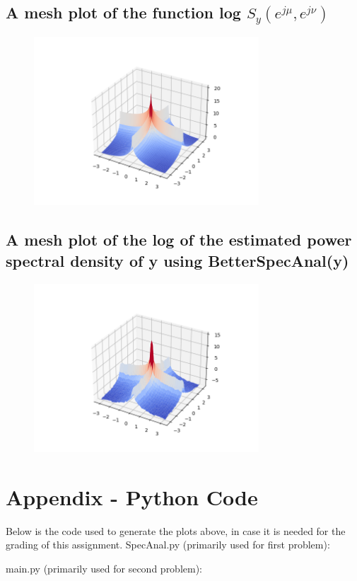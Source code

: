 \documentclass{article}
\begin{document}
\subsection{A mesh plot of the function log $S_y(e^{j\mu}, e^{j\nu})$}
\begin{figure}[H]
    \centering
    \includegraphics[width=0.75\textwidth]{../images/y-log-pwr-spec-density-theoretical.png}
    \begin{center}
    \end{center}
\end{figure}
\subsection{A mesh plot of the log of the estimated power spectral density of y using BetterSpecAnal(y)}
\begin{figure}[H]
    \centering
    \includegraphics[width=0.75\textwidth]{../images/y-log-pwr-spec-density-better.png}
    \begin{center}
    \end{center}
\end{figure}



\section{Appendix - Python Code}
Below is the code used to generate the plots above, in case it is needed for the grading of this assignment.
SpecAnal.py (primarily used for first problem):

main.py (primarily used for second problem):

\end{document}
